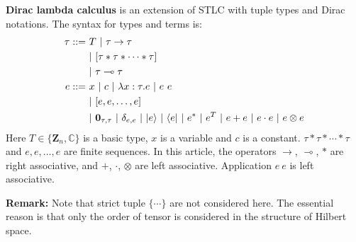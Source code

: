 \begin{definition}
  \textbf{Dirac lambda calculus} is an extension of STLC with tuple types and Dirac notations. The syntax for types and terms is:
  \begin{align*}
    \tau ::=&\ T\ |\ \tau \to \tau\\
      &\ |\ [ \tau *\tau*\cdots * \tau ] \\
      &\ |\ \tau \multimap \tau\\
    e ::=&\ x\ |\ c\ |\ \lambda x : \tau. e\ |\ e\ e\\
      &\ |\ [e, e, \dots, e] \\
      &\ |\ \mathbf{0}_{\tau, \tau}\ |\ \delta_{e, e}\ |\ |e\rangle\ |\ \langle e|\ |\ e^*\ |\ e^T\ |\ e + e\ |\ e \cdot e\ |\ e \otimes e
  \end{align*}
  Here $T \in \{\mathbf{Z}_n, \mathbb{C}\}$ is a basic type, $x$ is a variable and $c$ is a constant. $\tau *\tau*\cdots * \tau$ and $e, e, \dots, e$ are finite sequences.
  In this article, the operators $\to$, $\multimap$, $*$ are right associative, and $+$, $\cdot$, $\otimes$ are left associative. Application $e\ e$ is left associative.
\end{definition}

\textbf{Remark: } Note that strict tuple $\{\cdots\}$ are not considered here. The essential reason is that only the order of tensor is considered in the structure of Hilbert space.


